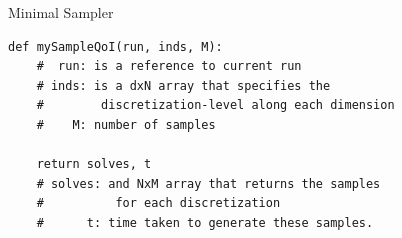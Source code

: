 


\begin{frame}[fragile]{Minimal Sampler}
\begin{verbatim}
def mySampleQoI(run, inds, M):
    #  run: is a reference to current run
    # inds: is a dxN array that specifies the
    #        discretization-level along each dimension
    #    M: number of samples

    return solves, t
    # solves: and NxM array that returns the samples
    #          for each discretization
    #      t: time taken to generate these samples.
\end{verbatim}
\end{frame}

